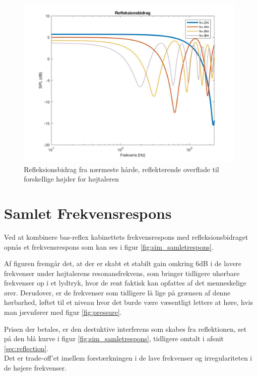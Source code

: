 \begin{figure}[h!]
	\centering
	\includegraphics[width=\textwidth]{Pics/refleksionsbidrag}
	\caption{Refleksionsbidrag fra nærmeste hårde, reflekterende overflade til forskellige højder for højtaleren } 
	\label{fig:refleksionsbidrag}
\end{figure}




\section{Samlet Frekvensrespons}

Ved at kombinere bas-reflex kabinettets frekvensrespons med refleksionsbidraget opnås et frekvensrespons som kan ses i figur \ref{fig:sim_samletrespons}.

Af figuren fremgår det, at der er skabt et stabilt gain omkring 6dB i de lavere frekvenser under højtalerens resonansfrekvens, som bringer tidligere uhørbare frekvenser op i et lydtryk, hvor de rent faktisk kan opfattes af det menneskelige ører. Derudover, er de frekvenser som tidligere lå lige på grænsen af denne hørbarhed, løftet til et niveau hvor det burde være væsentligt lettere at høre, hvis man jævnfører med figur \ref{fig:pressure}.

Prisen der betales, er den destuktive interferens som skabes fra reflektionen, set på den blå kurve i figur \ref{fig:sim_samletrespons}, tidligere omtalt i afsnit \ref{sec:reflection}.\\
Det er trade-off'et imellem forstærkningen i de lave frekvenser og irregulariteten i de højere frekvenser. 

